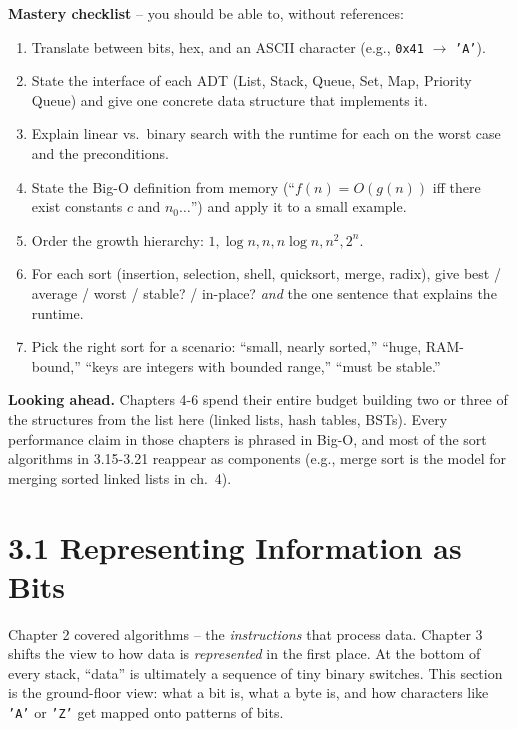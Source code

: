 \documentclass[11pt]{article}
\begin{document}
\begin{ideabox}
\textbf{Mastery checklist} -- you should be able to, without references:
\begin{enumerate}
    \item Translate between bits, hex, and an ASCII character (e.g.,
          \texttt{0x41} $\to$ \texttt{'A'}).
    \item State the interface of each ADT (List, Stack, Queue, Set, Map,
          Priority Queue) and give one concrete data structure that
          implements it.
    \item Explain linear vs.\ binary search with the runtime for each on
          the worst case and the preconditions.
    \item State the Big-O definition from memory (``$f(n) = O(g(n))$
          iff there exist constants $c$ and $n_0 \ldots$'') and apply it
          to a small example.
    \item Order the growth hierarchy: $1, \log n, n, n \log n, n^2, 2^n$.
    \item For each sort (insertion, selection, shell, quicksort, merge,
          radix), give best / average / worst / stable? / in-place?
          \emph{and} the one sentence that explains the runtime.
    \item Pick the right sort for a scenario: ``small, nearly sorted,''
          ``huge, RAM-bound,'' ``keys are integers with bounded range,''
          ``must be stable.''
\end{enumerate}

\textbf{Looking ahead.} Chapters 4-6 spend their entire budget building
two or three of the structures from the list here (linked lists, hash
tables, BSTs). Every performance claim in those chapters is phrased in
Big-O, and most of the sort algorithms in 3.15-3.21 reappear as
components (e.g., merge sort is the model for merging sorted linked
lists in ch.~4).
\end{ideabox}

\section{3.1 Representing Information as Bits}

Chapter 2 covered algorithms -- the \emph{instructions} that process
data. Chapter 3 shifts the view to how data is \emph{represented} in
the first place. At the bottom of every stack, ``data'' is ultimately
a sequence of tiny binary switches. This section is the
ground-floor view: what a bit is, what a byte is, and how characters
like \texttt{'A'} or \texttt{'Z'} get mapped onto patterns of bits.
\end{document}
